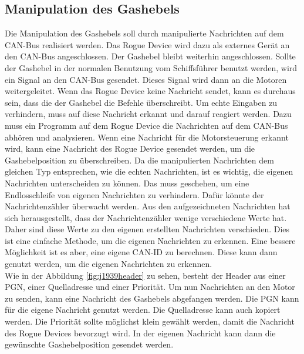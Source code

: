 \subsection{Manipulation des Gashebels} \label{sec:manipulationGashebel}
Die Manipulation des Gashebels soll durch manipulierte Nachrichten auf dem CAN-Bus realisiert werden.
Das Rogue Device wird dazu als externes Gerät an den CAN-Bus angeschlossen. Der Gashebel bleibt weiterhin angeschlossen.
Sollte der Gashebel in der normalen Benutzung vom Schiffsführer benutzt werden, wird ein Signal an den CAN-Bus gesendet. 
Dieses Signal wird dann an die Motoren weitergeleitet. Wenn das Rogue Device keine Nachricht sendet, kann es durchaus sein, dass
die der Gashebel die Befehle überschreibt.
Um echte Eingaben zu verhindern, muss auf diese Nachricht erkannt und darauf reagiert werden. 
Dazu muss ein Programm auf dem Rogue Device die Nachrichten auf dem CAN-Bus abhören und analysieren.
Wenn eine Nachricht für die Motorsteuerung erkannt wird, kann eine Nachricht des Rogue Device gesendet werden, um die Gashebelposition
zu überschreiben. 
Da die manipulierten Nachrichten dem gleichen Typ entsprechen, wie die echten Nachrichten, ist es wichtig, die eigenen Nachrichten
unterscheiden zu können.
Das muss geschehen, um eine Endlosschleife von eigenen Nachrichten zu verhindern. Dafür könnte
der Nachrichtenzähler überwacht werden. Aus den aufgezeichneten Nachrichten hat sich herausgestellt, dass der 
Nachrichtenzähler wenige verschiedene Werte hat. Daher sind diese Werte zu den eigenen erstellten Nachrichten 
verschieden. Dies ist eine einfache Methode, um die eigenen Nachrichten zu erkennen. Eine bessere Möglichkeit ist es aber,
eine eigene CAN-ID zu berechnen. Diese kann dann genutzt werden, um die eigenen Nachrichten zu erkennen. \\
Wie in der Abbildung \ref{fig:j1939header} zu sehen, besteht der Header aus einer PGN, einer Quelladresse und einer Priorität. Um nun Nachrichten
an den Motor zu senden, kann eine Nachricht des Gashebels abgefangen werden. Die PGN kann für die eigene Nachricht genutzt
werden. Die Quelladresse kann auch kopiert werden. Die Priorität sollte möglichst klein gewählt werden, 
damit die Nachricht des Rogue Devices bevorzugt wird. In der eigenen Nachricht kann dann die gewünschte Gashebelposition gesendet werden.

